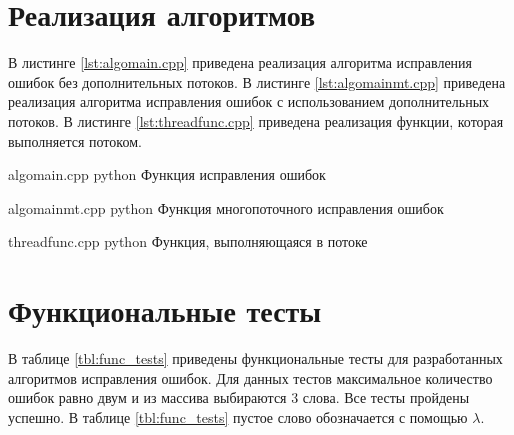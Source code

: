 \section{Реализация алгоритмов}

В листинге \ref{lst:algomain.cpp} приведена реализация алгоритма исправления ошибок без дополнительных потоков. 
В листинге \ref{lst:algomainmt.cpp} приведена реализация алгоритма исправления ошибок с использованием дополнительных потоков.
В листинге \ref{lst:threadfunc.cpp} приведена реализация функции, которая выполняется потоком.

\clearpage
{}
{algomain.cpp} %
{python} %
{Функция исправления ошибок} %

\clearpage

{algomainmt.cpp} %
{python} %
{Функция многопоточного исправления ошибок} %

\clearpage

{threadfunc.cpp} %
{python} %
{Функция, выполняющаяся в потоке} %

\clearpage

\section{Функциональные тесты}

В таблице \ref{tbl:func_tests} приведены функциональные тесты для разработанных алгоритмов исправления ошибок. Для данных тестов максимальное количество ошибок равно двум и из массива выбираются 3 слова. Все тесты пройдены успешно. В таблице \ref{tbl:func_tests} пустое слово обозначается с помощью $\lambda$.

